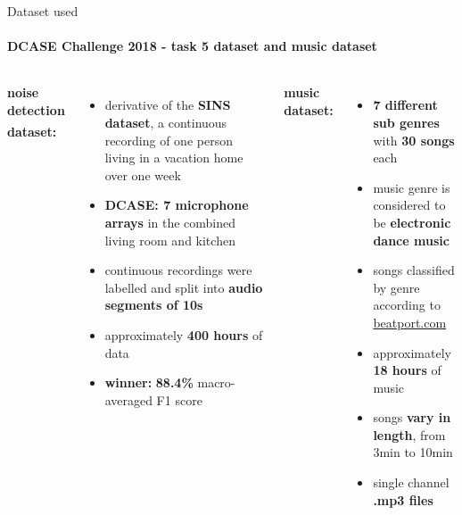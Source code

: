 \documentclass[aspectratio=169, professionalfonts]{beamer}
\begin{document}
\begin{frame}{Dataset used}
    \framesubtitle{DCASE Challenge 2018 - task 5 dataset and music dataset}
    
    \begin{columns}[T]
    
        \textbf{noise detection dataset:}\textsuperscript{\cite{DCASE}}
        \begin{itemize}
    		\item derivative of the \textbf{SINS dataset}, a continuous recording of one person living in a vacation home over one week
    		\item \textbf{DCASE: 7 microphone arrays} in the combined living room and kitchen
    		\item continuous recordings were labelled and split into \textbf{audio segments of 10s}
    		\item approximately \textbf{400 hours} of data
    		\item \textbf{winner:} \textbf{88.4\%} macro-averaged F1 score
    	\end{itemize}

        \textbf{music dataset:}
        \begin{itemize}
    		\item \textbf{7 different sub genres} with \textbf{30 songs} each
    		\item music genre is considered to be \textbf{electronic dance music}
    		\item songs classified by genre according to \href{https://www.beatport.com/}{beatport.com}
    		\item approximately \textbf{18 hours} of music
    		\item songs \textbf{vary in length}, from 3min to 10min
    		\item single channel \textbf{.mp3 files}
    	\end{itemize}
    \end{columns}
    
\end{frame}
\end{document}
